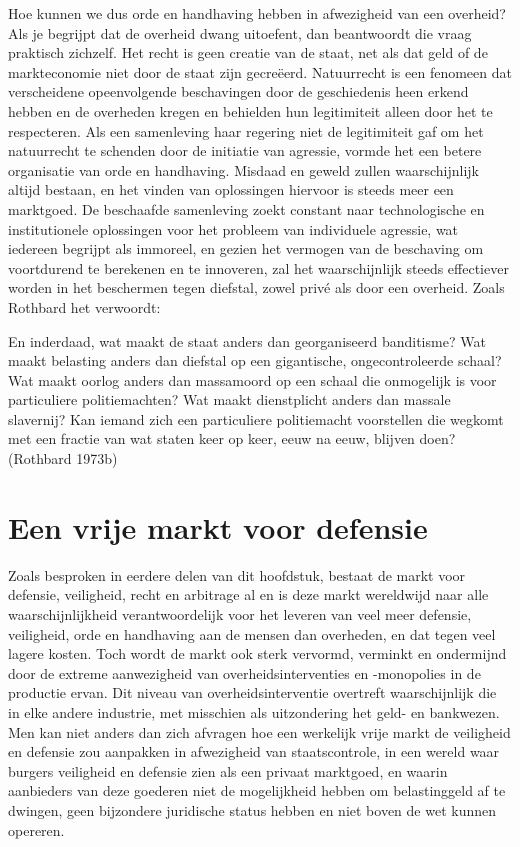\documentclass[
  a5paper,
  smalldemyvopaper,11pt,twoside,onecolumn,openright,extrafontsizes,
hidelinks]{memoir}
\begin{document}
Hoe kunnen we dus orde en handhaving hebben in afwezigheid van een
overheid? Als je begrijpt dat de overheid dwang uitoefent, dan
beantwoordt die vraag praktisch zichzelf. Het recht is geen creatie van
de staat, net als dat geld of de markteconomie niet door de staat zijn
gecreëerd. Natuurrecht is een fenomeen dat verscheidene opeenvolgende
beschavingen door de geschiedenis heen erkend hebben en de overheden
kregen en behielden hun legitimiteit alleen door het te respecteren. Als
een samenleving haar regering niet de legitimiteit gaf om het
natuurrecht te schenden door de initiatie van agressie, vormde het een
betere organisatie van orde en handhaving. Misdaad en geweld zullen
waarschijnlijk altijd bestaan, en het vinden van oplossingen hiervoor is
steeds meer een marktgoed. De beschaafde samenleving zoekt constant naar
technologische en institutionele oplossingen voor het probleem van
individuele agressie, wat iedereen begrijpt als immoreel, en gezien het
vermogen van de beschaving om voortdurend te berekenen en te innoveren,
zal het waarschijnlijk steeds effectiever worden in het beschermen tegen
diefstal, zowel privé als door een overheid. Zoals Rothbard het
verwoordt:

En inderdaad, wat maakt de staat anders dan georganiseerd banditisme?
Wat maakt belasting anders dan diefstal op een gigantische,
ongecontroleerde schaal? Wat maakt oorlog anders dan massamoord op een
schaal die onmogelijk is voor particuliere politiemachten? Wat maakt
dienstplicht anders dan massale slavernij? Kan iemand zich een
particuliere politiemacht voorstellen die wegkomt met een fractie van
wat staten keer op keer, eeuw na eeuw, blijven doen? (Rothbard 1973b)

\section{Een vrije markt voor
defensie}\label{een-vrije-markt-voor-defensie}

Zoals besproken in eerdere delen van dit hoofdstuk, bestaat de markt
voor defensie, veiligheid, recht en arbitrage al en is deze markt
wereldwijd naar alle waarschijnlijkheid verantwoordelijk voor het
leveren van veel meer defensie, veiligheid, orde en handhaving aan de
mensen dan overheden, en dat tegen veel lagere kosten. Toch wordt de
markt ook sterk vervormd, verminkt en ondermijnd door de extreme
aanwezigheid van overheidsinterventies en -monopolies in de productie
ervan. Dit niveau van overheidsinterventie overtreft waarschijnlijk die
in elke andere industrie, met misschien als uitzondering het geld- en
bankwezen. Men kan niet anders dan zich afvragen hoe een werkelijk vrije
markt de veiligheid en defensie zou aanpakken in afwezigheid van
staatscontrole, in een wereld waar burgers veiligheid en defensie zien
als een privaat marktgoed, en waarin aanbieders van deze goederen niet
de mogelijkheid hebben om belastinggeld af te dwingen, geen bijzondere
juridische status hebben en niet boven de wet kunnen opereren.
\end{document}
